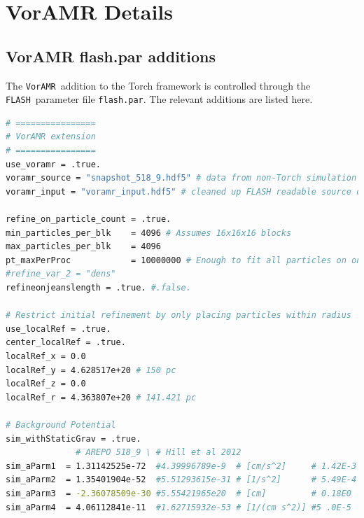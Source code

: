 \documentclass[twoside]{drexel-thesis}
\newcommand\voramr{\texttt{VorAMR}}
\newcommand\flash{\texttt{FLASH}}
\begin{document}


\appendix
\chapter{VorAMR Details}
\section{VorAMR flash.par additions}
The \voramr~addition to the Torch framework is controlled through the \flash~parameter file \texttt{flash.par}. The relevant additions are listed here.
\begin{lstlisting}[language=bash]
# ================
# VorAMR extension
# ================
use_voramr = .true.
voramr_source = "snapshot_518_9.hdf5" # data from non-Torch simulation
voramr_input = "voramr_input.hdf5" # cleaned up FLASH readable source data

refine_on_particle_count = .true.
min_particles_per_blk    = 4096 # Assumes 16x16x16 blocks
max_particles_per_blk    = 4096
pt_maxPerProc            = 10000000 # Enough to fit all particles on one proc
#refine_var_2 = "dens"
refineonjeanslength = .true. #.false.

# Restrict initial refinement by only placing particles within radius
use_localRef = .true.
center_localRef = .true.
localRef_x = 0.0 
localRef_y = 4.628517e+20 # 150 pc 
localRef_z = 0.0 
localRef_r = 4.363807e+20 # 141.421 pc 

# Background Potential
sim_withStaticGrav = .true.
              # AREPO 518_9 \ # Hill et al 2012
sim_aParm1  = 1.31142525e-72  #4.39996789e-9  # [cm/s^2]     # 1.42E-3 [kpc/Myr^2]
sim_aParm2  = 1.35401904e-52  #5.51293615e-31 # [1/s^2]      # 5.49E-4 [1/Myr^2]
sim_aParm3  = -2.36078509e-30 #5.55421965e20  # [cm]         # 0.18E0  [kpc]
sim_aParm4  = 4.06112841e-11  #1.62715932e-53 # [1/(cm s^2)] #5 .0E-5  [1/kpc Myr^2]
\end{lstlisting}
\end{document}
